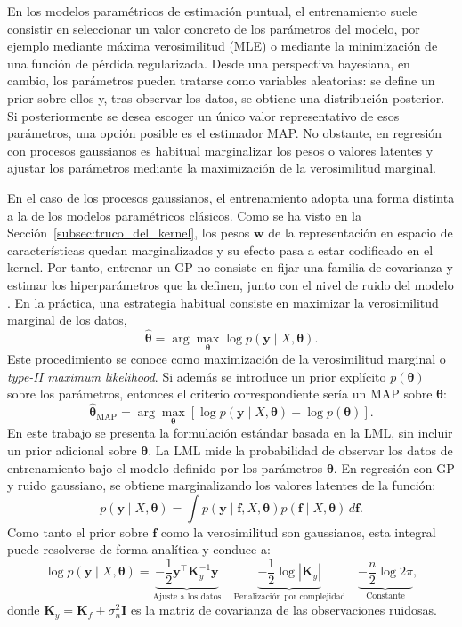 En los modelos paramétricos de estimación puntual, el entrenamiento suele consistir en
seleccionar un valor concreto de los parámetros del modelo, por ejemplo mediante máxima
verosimilitud (MLE) o mediante la minimización de una función de pérdida regularizada.
Desde una perspectiva bayesiana, en cambio, los parámetros pueden tratarse como variables
aleatorias: se define un prior sobre ellos y, tras observar los datos, se obtiene una
distribución posterior. Si posteriormente se desea escoger un único valor representativo de
esos parámetros, una opción posible es el estimador MAP. No obstante, en regresión con
procesos gaussianos es habitual marginalizar los pesos o valores latentes y ajustar los
parámetros mediante la maximización de la verosimilitud marginal.

En el caso de los procesos gaussianos, el entrenamiento adopta una forma distinta a la
de los modelos paramétricos clásicos. Como se ha visto en la
Sección~\ref{subsec:truco_del_kernel}, los pesos \(\bm{w}\) de la representación en
espacio de características quedan marginalizados y su efecto pasa a estar codificado en el
kernel. Por tanto, entrenar un GP no consiste  en fijar una familia de covarianza y estimar los hiperparámetros que la definen, junto
con el nivel de ruido del modelo \cite{rasmussen2006gpml}. En la práctica, una estrategia habitual consiste en maximizar la
verosimilitud marginal de los datos,
\[
\hat{\bm{\theta}}
=
\arg\max_{\bm{\theta}}
\log p(\bm{y}\mid X,\bm{\theta}).
\]
Este procedimiento se conoce como maximización de la verosimilitud marginal
o \emph{type-II maximum likelihood}. Si además se introduce un prior explícito
\(p(\bm{\theta})\) sobre los parámetros, entonces el criterio correspondiente sería un
MAP sobre \(\bm{\theta}\):
\[
\hat{\bm{\theta}}_{\mathrm{MAP}}
=
\arg\max_{\bm{\theta}}
\left[
\log p(\bm{y}\mid X,\bm{\theta})
+
\log p(\bm{\theta})
\right].
\]
En este trabajo se presenta la formulación estándar basada en la LML,
sin incluir un prior adicional sobre \(\bm{\theta}\).
La LML mide la probabilidad de observar los datos de entrenamiento
bajo el modelo definido por los parámetros \(\bm{\theta}\). En regresión con GP y ruido
gaussiano, se obtiene marginalizando los valores latentes de la función:
\[
p(\bm{y}\mid X,\bm{\theta})
=
\int p(\bm{y}\mid \bm{f},X,\bm{\theta})p(\bm{f}\mid X,\bm{\theta})\,d\bm{f}.
\]
Como tanto el prior sobre \(\bm{f}\) como la verosimilitud son gaussianos, esta integral puede
resolverse de forma analítica y conduce a:
\begin{equation}
\log p(\bm{y}\mid X,\bm{\theta})
=
\underbrace{-\frac{1}{2}\bm{y}^\top \bm{K}_y^{-1}\bm{y}}_{\text{Ajuste a los datos}}
\quad
\underbrace{-\frac{1}{2}\log|\bm{K}_y|}_{\text{Penalización por complejidad}}
\quad
\underbrace{-\frac{n}{2}\log 2\pi}_{\text{Constante}},
\label{eq:lml}
\end{equation}
donde
\(
\bm{K}_y=\bm{K}_f+\sigma_n^2\bm{I}
\)
es la matriz de covarianza de las observaciones ruidosas.

